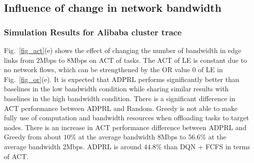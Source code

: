 \documentclass[10pt, conference, letterpaper]{IEEEtran}
\begin{document}



\subsection{Influence of change in network bandwidth}

\subsubsection{Simulation Results for Alibaba cluster trace}



Fig.~\ref{fig_act}(e) shows the effect of changing the number of bandwidth in edge links from $2$Mbps to $8$Mbps on ACT of tasks. The ACT of LE is constant due to no network flows, which can be strengthened by the OR value $0$ of LE in Fig.~\ref{fig_or}(e). It is expected that ADPRL performs significantly better than baselines in the low bandwidth condition while sharing similar results with baselines in the high bandwidth condition. There is a significant difference in ACT performance between ADPRL and Random. Greedy is not able to make fully use of computation and bandwidth resources when offloading tasks to target nodes. There is an increase in ACT performance difference between ADPRL and Greedy from about $10\%$ at the average bandwidth $8$Mbps to $56.6\%$ at the average bandwidth $2$Mbps. ADPRL is around $44.8\%$ than DQN + FCFS in terms of ACT. 
\end{document}

